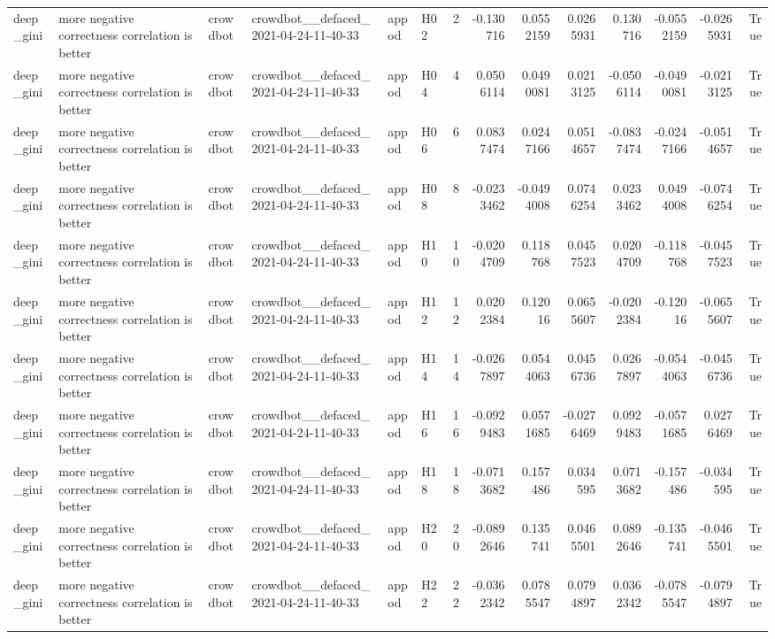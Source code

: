 \begin{longtable}{llllllrrrrrrrr}
deep\_gini & more negative correctness correlation is better & crowdbot & crowdbot\_\_defaced\_2021-04-24-11-40-33 & appod & H02 & 2 & -0.130716 & 0.0552159 & 0.0265931 & 0.130716 & -0.0552159 & -0.0265931 & True \\
deep\_gini & more negative correctness correlation is better & crowdbot & crowdbot\_\_defaced\_2021-04-24-11-40-33 & appod & H04 & 4 & 0.0506114 & 0.0490081 & 0.0213125 & -0.0506114 & -0.0490081 & -0.0213125 & True \\
deep\_gini & more negative correctness correlation is better & crowdbot & crowdbot\_\_defaced\_2021-04-24-11-40-33 & appod & H06 & 6 & 0.0837474 & 0.0247166 & 0.0514657 & -0.0837474 & -0.0247166 & -0.0514657 & True \\
deep\_gini & more negative correctness correlation is better & crowdbot & crowdbot\_\_defaced\_2021-04-24-11-40-33 & appod & H08 & 8 & -0.0233462 & -0.0494008 & 0.0746254 & 0.0233462 & 0.0494008 & -0.0746254 & True \\
deep\_gini & more negative correctness correlation is better & crowdbot & crowdbot\_\_defaced\_2021-04-24-11-40-33 & appod & H10 & 10 & -0.0204709 & 0.118768 & 0.0457523 & 0.0204709 & -0.118768 & -0.0457523 & True \\
deep\_gini & more negative correctness correlation is better & crowdbot & crowdbot\_\_defaced\_2021-04-24-11-40-33 & appod & H12 & 12 & 0.0202384 & 0.12016 & 0.0655607 & -0.0202384 & -0.12016 & -0.0655607 & True \\
deep\_gini & more negative correctness correlation is better & crowdbot & crowdbot\_\_defaced\_2021-04-24-11-40-33 & appod & H14 & 14 & -0.0267897 & 0.0544063 & 0.0456736 & 0.0267897 & -0.0544063 & -0.0456736 & True \\
deep\_gini & more negative correctness correlation is better & crowdbot & crowdbot\_\_defaced\_2021-04-24-11-40-33 & appod & H16 & 16 & -0.0929483 & 0.0571685 & -0.0276469 & 0.0929483 & -0.0571685 & 0.0276469 & True \\
deep\_gini & more negative correctness correlation is better & crowdbot & crowdbot\_\_defaced\_2021-04-24-11-40-33 & appod & H18 & 18 & -0.0713682 & 0.157486 & 0.034595 & 0.0713682 & -0.157486 & -0.034595 & True \\
deep\_gini & more negative correctness correlation is better & crowdbot & crowdbot\_\_defaced\_2021-04-24-11-40-33 & appod & H20 & 20 & -0.0892646 & 0.135741 & 0.0465501 & 0.0892646 & -0.135741 & -0.0465501 & True \\
deep\_gini & more negative correctness correlation is better & crowdbot & crowdbot\_\_defaced\_2021-04-24-11-40-33 & appod & H22 & 22 & -0.0362342 & 0.0785547 & 0.0794897 & 0.0362342 & -0.0785547 & -0.0794897 & True \\

\end{longtable}
